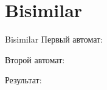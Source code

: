 \section{Bisimilar}
\begin{frame}{Bisimilar}
	Первый автомат:


	Второй автомат:


	Результат:

\end{frame}
